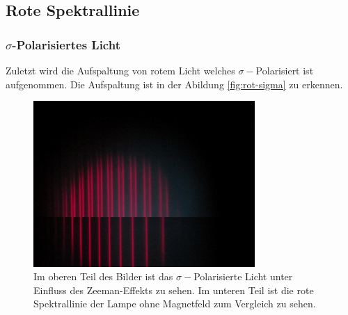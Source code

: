 \subsection{Rote Spektrallinie}
\subsubsection{\boldmath\texorpdfstring{$\sigma$}{sigma}-Polarisiertes Licht}
Zuletzt wird die Aufspaltung von rotem Licht welches $\sigma -$Polarisiert ist aufgenommen.
Die Aufspaltung ist in der Abildung \autoref{fig:rot-sigma} zu erkennen.

\begin{figure}
    \centering
    \includegraphics[width=0.75\textwidth]{content/data/Rot_0_sigma_uebernander.JPG}
    \caption{Im oberen Teil des Bilder ist das $\sigma -$Polarisierte Licht unter Einfluss des Zeeman-Effekts zu sehen. Im unteren Teil ist die rote Spektrallinie der Lampe ohne Magnetfeld zum Vergleich zu sehen.}
    \label{fig:rot-sigma}
\end{figure}

